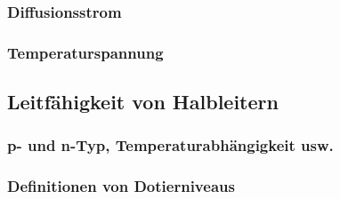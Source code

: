 	\subsubsection{Diffusionsstrom}
	\subsubsection{Temperaturspannung}	
\subsection{Leitfähigkeit von Halbleitern}
	\subsubsection{p- und n-Typ, Temperaturabhängigkeit usw.}
	\subsubsection{Definitionen von Dotierniveaus}



